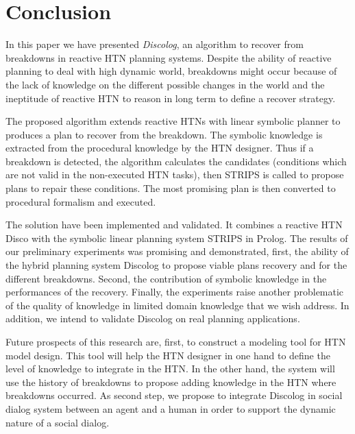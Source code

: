 \documentclass[conference]{IEEEtran}
\begin{document}
	
	\section{Conclusion}
	\par In this paper we have presented \emph{Discolog}, an algorithm to recover from breakdowns in reactive HTN planning systems.  Despite the ability of reactive planning  to deal with high dynamic world,  breakdowns might occur because of the lack of knowledge on the different possible changes in the world and the ineptitude  of reactive HTN to reason in long term to define a recover strategy. 
	\par The proposed algorithm extends reactive HTNs with linear symbolic planner to produces a plan to recover from the breakdown. The symbolic knowledge is extracted from the procedural knowledge by the HTN designer. Thus if a breakdown is detected, the algorithm calculates the candidates (conditions which are not valid in the non-executed HTN tasks), then 
	STRIPS is called to propose plans to repair these conditions. The most promising plan is then converted to procedural formalism and executed. 
	\par The solution have been implemented and validated. It combines a reactive HTN Disco with the symbolic linear planning system STRIPS in Prolog.  The
	results of our preliminary experiments was promising and demonstrated, first, the ability of the hybrid planning system Discolog to propose viable plans recovery and for the different breakdowns. Second, the  contribution of symbolic knowledge in the performances of the recovery. Finally, the experiments raise another problematic of the quality of  knowledge in limited domain knowledge that we wish address. In addition, we intend to validate Discolog on real planning applications.  
	\par Future prospects of this research are, first, to construct a modeling tool for HTN	model design. This tool will help the HTN designer in one hand to define the level of knowledge to integrate in the HTN. In the other hand, the system will use the history of breakdowns to propose adding knowledge in the HTN where breakdowns occurred. As second step, we propose to integrate Discolog in social dialog system between an agent and a human in order to support the dynamic nature of a social dialog.
	
\end{document}
